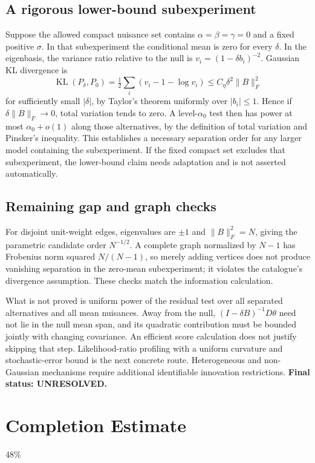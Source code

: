 \documentclass[11pt]{article}
\begin{document}
\subsection*{A rigorous lower-bound subexperiment}
Suppose the allowed compact nuisance set contains $\alpha=\beta=\gamma=0$
and a fixed positive $\sigma$. In that subexperiment the conditional mean
is zero for every $\delta$. In the eigenbasis, the variance ratio relative
to the null is $v_i=(1-\delta b_i)^{-2}$. Gaussian KL divergence is
\[
 \operatorname{KL}(P_\delta,P_0)
 =\tfrac12\sum_i(v_i-1-\log v_i)
 \leq C_\eta\delta^2\|B\|_F^2
\]
for sufficiently small $|\delta|$, by Taylor's theorem uniformly over
$|b_i|\leq1$. Hence if $\delta\|B\|_F\to0$, total variation tends to
zero. A level-$\alpha_0$ test then has power at most $\alpha_0+o(1)$
along those alternatives, by the definition of total variation and
Pinsker's inequality. This establishes a necessary separation order for
any larger model containing the subexperiment. If the fixed compact set
excludes that subexperiment, the lower-bound claim needs adaptation and is
not asserted automatically.

\subsection*{Remaining gap and graph checks}
For disjoint unit-weight edges, eigenvalues are $\pm1$ and
$\|B\|_F^2=N$, giving the parametric candidate order $N^{-1/2}$.
A complete graph normalized by $N-1$ has Frobenius norm squared
$N/(N-1)$, so merely adding vertices does not produce vanishing separation
in the zero-mean subexperiment; it violates the catalogue's divergence
assumption. These checks match the information calculation.

What is not proved is uniform power of the residual test over all separated
alternatives and all mean nuisances. Away from the null,
$(I-\delta B)^{-1}D\theta$ need not lie in the null mean span, and its
quadratic contribution must be bounded jointly with changing covariance.
An efficient score calculation does not justify skipping that step.
Likelihood-ratio profiling with a uniform curvature and stochastic-error
bound is the next concrete route. Heterogeneous and non-Gaussian mechanisms
require additional identifiable innovation restrictions.
\textbf{Final status: UNRESOLVED.}

\section{Completion Estimate}
48\%
\end{document}

